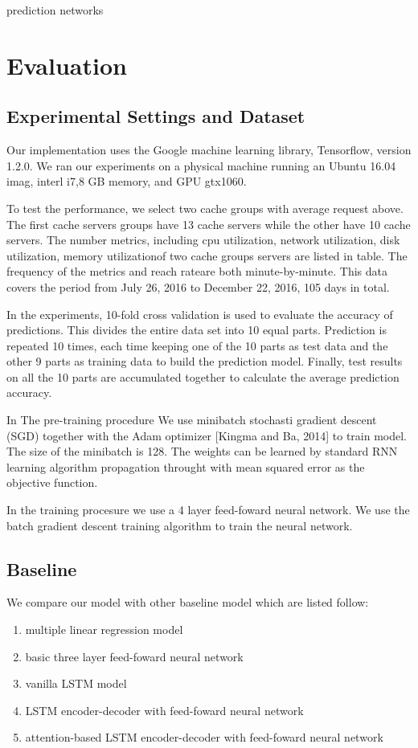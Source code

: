 \documentclass[5p]{elsarticle}
\newcommand{\dabiaolv}{reach rate}
\begin{document}
prediction networks

\section{Evaluation}
\subsection{Experimental Settings and Dataset}
Our implementation uses the Google machine learning library, Tensorflow, version 1.2.0. We ran our experiments on a physical machine running an Ubuntu 16.04 imag, interl i7,8 GB memory, and GPU gtx1060.

To test the performance, we select two cache groups with average request above. The first cache servers groups have 13 cache servers while the other have 10 cache servers. The number metrics, including cpu utilization, network utilization, disk utilization, memory utilizationof two cache groups servers are listed in table. The frequency of the metrics and  \dabiaolv are both minute-by-minute. This data covers the period from July 26, 2016 to December 22, 2016, 105 days in total.

In the experiments, 10-fold cross validation is used to evaluate the accuracy of predictions. This divides the entire data set into 10 equal parts.  Prediction is repeated 10 times, each time keeping one of the 10 parts as test data and the other 9 parts as training data to build the prediction model. Finally, test results on all the 10 parts are accumulated together to calculate the average prediction accuracy.

In The pre-training procedure We use minibatch stochasti gradient descent (SGD) together with the Adam optimizer [Kingma and Ba, 2014] to train model. The size of the minibatch is 128. The weights can be learned by standard RNN learning algorithm propagation throught with mean squared error as the objective function.

In the training procesure we use a 4 layer feed-foward neural network. We use the batch gradient descent training algorithm to train the neural network.

\subsection{Baseline}
We compare our model with other baseline model which are listed follow:
\begin{enumerate}
  \item multiple linear regression model
  \item basic three layer feed-foward neural network
  \item vanilla LSTM model
  \item LSTM encoder-decoder with feed-foward neural network
  \item attention-based LSTM encoder-decoder with feed-foward neural network
\end{enumerate}
\end{document}
